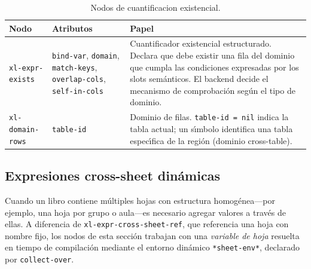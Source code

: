 \documentclass[12pt,a4paper]{report}
\begin{document}
\begin{table}[h!]
\centering
\caption{Nodos de cuantificacion existencial.}
\label{tab:ast-cuantificacion}
\renewcommand{\arraystretch}{1.3}
\begin{tabular}{p{3.6cm} p{4.8cm} p{5.4cm}}
\hline
\textbf{Nodo} & \textbf{Atributos} & \textbf{Papel} \\
\hline
\texttt{xl-expr-exists}
  & \texttt{bind-var}, \texttt{domain},\newline
    \texttt{match-keys},\newline
    \texttt{overlap-cols},\newline
    \texttt{self-in-cols}
  & Cuantificador existencial estructurado.  Declara que debe
    existir una fila del dominio que cumpla las condiciones
    expresadas por los slots sem\'anticos.  El backend decide
    el mecanismo de comprobaci\'on seg\'un el tipo de dominio. \\
\hline
\texttt{xl-domain-rows}
  & \texttt{table-id}
  & Dominio de filas.  \texttt{table-id = nil} indica la
    tabla actual; un s\'{\i}mbolo identifica una tabla
    espec\'{\i}fica de la regi\'on (dominio cross-table). \\
\hline
\end{tabular}
\end{table}

\subsection{Expresiones cross-sheet din\'amicas}
\label{sec:ast-cross-sheet}

Cuando un libro contiene m\'ultiples hojas con estructura homog\'enea---por
ejemplo, una hoja por grupo o aula---es necesario agregar valores a trav\'es
de ellas.  A diferencia de \texttt{xl-expr-cross-sheet-ref}, que referencia
una hoja con nombre fijo, los nodos de esta secci\'on trabajan con una
\emph{variable de hoja} resuelta en tiempo de compilaci\'on mediante el
entorno din\'amico \texttt{*sheet-env*}, declarado por \texttt{collect-over}.
\end{document}
